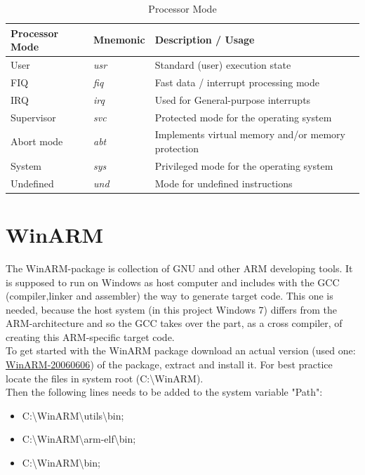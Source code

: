 \begin{table}[H]
\begin{tabular}{lll} %
\textbf{Processor Mode} &\textbf{Mnemonic}	 &\textbf{Description / Usage}  \\
\hline
\hline
  User&\textit{usr}& Standard (user) execution state\\
  FIQ&\textit{fiq}& Fast data / interrupt processing mode\\
  IRQ&\textit{irq}& Used for General-purpose interrupts\\
  Supervisor&\textit{svc}& Protected mode for the operating system\\
  Abort mode&\textit{abt}& Implements virtual memory and/or memory protection\\
  System&\textit{sys}& Privileged mode for the operating system\\
  Undefined&\textit{und}& Mode for undefined instructions\\

\end{tabular}
\caption[Processor Mode]{Processor Mode \cite{AT91Overview}\cite{AT91RTC}\cite{UNISTG}}
\label{tab:cpuMode}
\end{table}








\section{WinARM}
The WinARM-package is collection of GNU and other ARM developing tools. It is supposed to run on Windows as host computer and includes with the GCC (compiler,linker and assembler) the way to generate target code. This one is needed, because the host system (in this project Windows 7) differs from the ARM-architecture and so the GCC takes over the part, as a cross compiler, of creating this ARM-specific target code.\\
To get started with the WinARM package download an actual version (used one: \href{http://www.siwawi.arubi.uni-kl.de/avr_projects/arm_projects/WinARM-20060606.exe}{WinARM-20060606}) of the package, extract and install it. For best practice locate the files in system root (C:\textbackslash WinARM).\\
Then the following lines needs to be added to the system variable "Path":
\begin{itemize}
	\item C:\textbackslash WinARM\textbackslash utils\textbackslash bin;
	\item C:\textbackslash WinARM\textbackslash arm-elf\textbackslash bin;
	\item C:\textbackslash WinARM\textbackslash bin;
\end{itemize}

